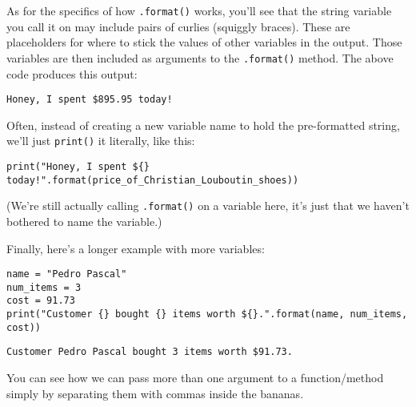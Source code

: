 As for the specifics of how \texttt{.format()} works, you'll see that the
string variable you call it on may include pairs of curlies (squiggly braces).
These are placeholders for where to stick the values of other variables in the
output. Those variables are then included as arguments to the
\texttt{.format()} method. The above code produces this output:

\begin{Verbatim}[fontsize=\small,samepage=true,frame=leftline,framesep=5mm,framerule=1mm]
Honey, I spent $895.95 today!
\end{Verbatim}

\pagebreak
Often, instead of creating a new variable name to hold the pre-formatted
string, we'll just \texttt{print()} it literally, like this:

\begin{Verbatim}[fontsize=\footnotesize,samepage=true,frame=single,framesep=3mm]
print("Honey, I spent ${} today!".format(price_of_Christian_Louboutin_shoes))
\end{Verbatim}

(We're still actually calling \texttt{.format()} on a variable here, it's just
that we haven't bothered to name the variable.)

\bigskip
Finally, here's a longer example with more variables:

\begin{Verbatim}[fontsize=\footnotesize,samepage=true,frame=single,framesep=3mm]
name = "Pedro Pascal"
num_items = 3
cost = 91.73
print("Customer {} bought {} items worth ${}.".format(name, num_items, cost))
\end{Verbatim}

\begin{Verbatim}[fontsize=\small,samepage=true,frame=leftline,framesep=5mm,framerule=1mm]
Customer Pedro Pascal bought 3 items worth $91.73.
\end{Verbatim}

You can see how we can pass more than one argument to a function/method simply
by separating them with commas inside the bananas.

